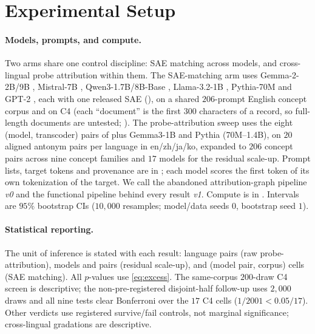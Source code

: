 \section{Experimental Setup}\label{sec:experiments}

\paragraph{Models, prompts, and compute.} Two arms share one control discipline: SAE
matching across models, and cross-lingual probe attribution within them. The SAE-matching arm uses Gemma-\mbox{2-2B/9B} \citep{gemma2024gemma2}, Mistral-7B \citep{jiang2023mistral},
Qwen3-1.7B/8B-Base \citep{yang2025qwen3}, Llama-3.2-1B \citep{grattafiori2024llama3}, Pythia-70M
\citep{biderman2023pythia} and GPT-2 \citep{radford2019gpt2}, each with one released SAE
(), on a shared $206$-prompt English concept corpus and on C4 (each ``document'' is the first
$300$ characters of a record, so full-length documents are untested; ). The
probe-attribution sweep uses the eight (model, transcoder) pairs of  plus
Gemma3-1B and Pythia (70M--1.4B), on $20$ aligned antonym pairs per language in en/zh/ja/ko,
expanded to $206$ concept pairs across nine concept families and $17$ models for the residual scale-up.
Prompt lists, target tokens and provenance are in ; each model scores the first
token of its own tokenization of the target. We call the abandoned attribution-graph pipeline
\emph{v0} and the functional pipeline behind every result \emph{v1}. Compute is in . Intervals are $95\%$ bootstrap
CIs ($10{,}000$ resamples; model/data seeds $0$, bootstrap seed $1$).

\paragraph{Statistical reporting.} The unit of inference is stated with each result: language
pairs (raw probe-attribution), models and pairs (residual scale-up), and (model pair, corpus)
cells (SAE matching). All $p$-values use \eqref{eq:excess}. The same-corpus $200$-draw C4 screen
is descriptive; the non-pre-registered disjoint-half follow-up uses $2{,}000$ draws and all nine
tests clear Bonferroni over the $17$ C4 cells ($1/2001<0.05/17$). Other verdicts use registered
survive/fail controls, not marginal significance; cross-lingual gradations are descriptive.
